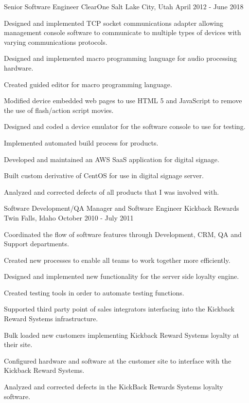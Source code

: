 \begin{cventries}
  \cventry
    {Senior Software Engineer} %
    {ClearOne} %
    {Salt Lake City, Utah} %
    {April 2012 - June 2018} %
    {
      \begin{cvitems} %
        \item {Designed and implemented TCP socket communications adapter allowing management console software to communicate to multiple types of devices with varying communications protocols.}
        \item {Designed and implemented macro programming language for audio processing hardware.}
        \item {Created guided editor for macro programming language.}
        \item {Modified device embedded web pages to use HTML 5 and JavaScript to remove the use of flash/action script movies.}
        \item {Designed and coded a device emulator for the software console to use for testing.}
        \item {Implemented automated build process for products.}
        \item {Developed and maintained an AWS SaaS application for digital signage.}
        \item {Built custom derivative of CentOS for use in digital signage server.}
        \item {Analyzed and corrected defects of all products that I was involved with.}
      \end{cvitems}
    }

  \cventry
    {Software Development/QA Manager and Software Engineer} %
    {Kickback Rewards} %
    {Twin Falls, Idaho} %
    {October 2010 - July 2011} %
    {
      \begin{cvitems} %
        \item {Coordinated the flow of software features through Development, CRM, QA and Support departments.}
        \item {Created new processes to enable all teams to work together more efficiently.}
        \item {Designed and implemented new functionality for the server side loyalty engine.}
        \item {Created testing tools in order to automate testing functions.}
        \item {Supported third party point of sales integrators interfacing into the Kickback Reward Systems infrastructure.}
        \item {Bulk loaded new customers implementing Kickback Reward Systems loyalty at their site.}
        \item {Configured hardware and software at the customer site to interface with the Kickback Reward Systems.}
        \item {Analyzed and corrected defects in the KickBack Rewards Systems loyalty software.}
      \end{cvitems}
    }


\end{cventries}
